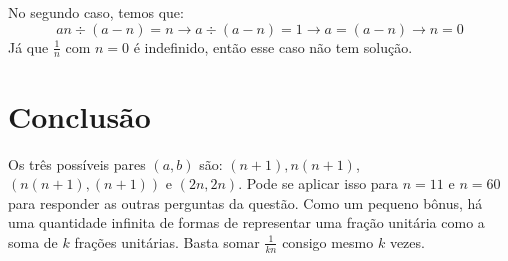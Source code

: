 \documentclass{article}
\begin{document}
No segundo caso, temos que:
\[an\div (a-n)=n\rightarrow a\div (a-n) = 1\rightarrow a = (a-n)\rightarrow n=0\]
Já que \(\frac{1}{n}\) com \(n=0\) é indefinido, então esse caso não tem solução.

\section{Conclusão}
Os três possíveis pares \((a,b)\) são:
\((n+1),n(n+1)\), \((n(n+1),(n+1))\) e \((2n,2n)\). Pode se aplicar isso para \(n=11\) e \(n=60\) para responder as outras perguntas da questão.
Como um pequeno bônus, há uma quantidade infinita de formas de representar uma fração unitária como a soma de \(k\) frações unitárias. Basta somar \(\frac{1}{kn}\) consigo mesmo \(k\) vezes.
\end{document}
